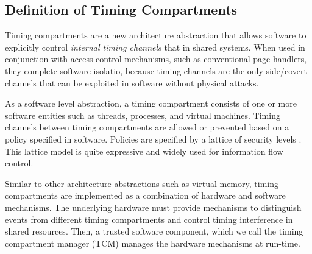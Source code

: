 \subsection{Definition of Timing Compartments}

Timing compartments are a new architecture abstraction that allows software to
explicitly control {\em internal timing channels} that in shared systems.
When used in conjunction with access
control mechanisms, such as conventional page handlers, they complete software 
isolatio, because timing channels are the only side/covert channels that can be
exploited in software without physical attacks.

As a software level abstraction, a timing compartment consists of one or more 
software entities such as threads, processes, and virtual machines.  Timing 
channels between timing compartments are allowed or prevented based on a policy 
specified in software.  Policies are specified by a lattice of security levels
\cite{denning}.
This lattice model is quite expressive and widely used for information flow 
control. 


Similar to other architecture abstractions such as virtual memory,
timing compartments are implemented as a combination of hardware and software
mechanisms. The underlying hardware must provide mechanisms to distinguish
events from different timing compartments and control timing interference in 
shared resources. Then, a trusted software component, which we call the timing 
compartment manager (TCM) manages the hardware mechanisms at run-time.

